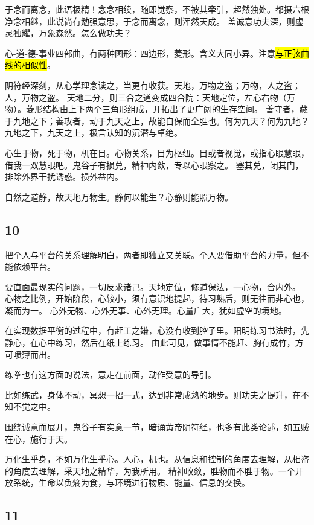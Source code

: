 于念而离念，此语极精！念念相续，随即觉察，不被其牵引，超然独处。都摄六根净念相继，此说尚有勉强意思，于念而离念，则浑然天成。
盖诚意功夫深，则虚灵独耀，万象森然。怎么做功夫？

心-道-德-事业四部曲，有两种图形：四边形，菱形。含义大同小异。注意\hl{与正弦曲线的相似性}。

阴符经深刻，从心学理念读之，当更有收获。天地，万物之盗；万物，人之盗；人，万物之盗。
天地二分，则三合之道变成四合院：天地定位，左心右物（万物）。菱形结构由上下两个三角形组成，开拓出了更广阔的生存空间。
善守者，藏于九地之下；善攻者，动于九天之上，故能自保而全胜也。何为九天？何为九地？九地之下，九天之上，极言认知的沉潜与卓绝。

心生于物，死于物，机在目。心物关系，目为枢纽。目或者视觉，或指心眼慧眼，借我一双慧眼吧。鬼谷子有损兑，精神内敛，专以心眼察之。
塞其兑，闭其门，排除外界干扰诱惑。损外益内。

自然之道静，故天地万物生。静何以能生？心静则能照万物。

\subsection{10}

把个人与平台的关系理解明白，两者即独立又关联。个人要借助平台的力量，但不能依赖平台。

要直面最现实的问题，一切反求诸己。天地定位，修道保法，一心物，合内外。
心物之比例，开始阶段，心较小，须有意识地提起，待习熟后，则无往而非心也，凝而为一。
心外无物、心外无事、心外无理。心量广大，犹如虚空的境地。

在实现数据平衡的过程中，有赶工之嫌，心没有收到腔子里。阳明练习书法时，先静心，在心中练习，然后在纸上练习。
由此可见，做事情不能赶、胸有成竹，方可喷薄而出。

练拳也有这方面的说法，意走在前面，动作受意的导引。

比如练武，身体不动，冥想一招一式，达到非常成熟的地步。则功夫之提升，在不知不觉之中。

围绕诚意而展开，鬼谷子有实意一节，暗诵黄帝阴符经，也多有此类论述，如五贼在心，施行于天。

万化生乎身，不如万化生乎心。人心，机也。从信息和控制的角度去理解，从相盗的角度去理解，采天地之精华，为我所用。
精神收敛，胜物而不胜于物。一个开放系统，生命以负熵为食，与环境进行物质、能量、信息的交换。

\subsection{11}

